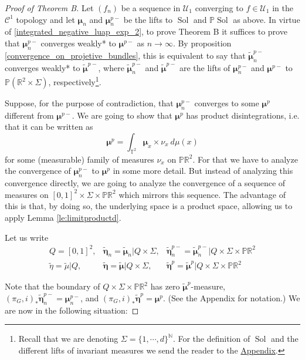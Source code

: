 \documentclass[10pt,a4paper]{amsart}
\newcommand{\N}{\mathbb{N}}
\newcommand{\Pp}{\mathbb P}
\newcommand{\RR}{\mathbb{R}^2}
\newcommand{\Sol}{\operatorname{Sol}}
\newcommand{\TT}{\mathbb{T}^2}
\newcommand{\bmu}{\boldsymbol{\mu}}
\newcommand{\tbeta}{\tilde{\boldsymbol{\eta}}}
\newcommand{\tbmu}{\tilde{\bmu}}
\newcommand{\teta}{\tilde{\eta}}
\newcommand{\tmu}{\tilde{\mu}}
\begin{document}
\begin{proof}[Proof of Theorem B]

Let $(f_n)$ be a sequence in $\mathcal U_1$ converging to $f\in\mathcal U_1$ in the $\mathcal C^1$ topology and let $\bmu_n$ and $\bmu_n^{p-}$ be the lifts to $\Sol$ and $\Pp \Sol$ as above. In virtue of \eqref{integrated_negative_luap_exp_2}, to prove Theorem B it suffices to prove that $\bmu_n^{p-}$ converges weakly* to $\bmu^{p-}$ as $n \to \infty$.
By proposition \ref{convergence_on_projetive_bundles}, this is equivalent to say that $\tbmu_n^{p-}$ converges weakly* to $\tbmu^{p-}$, where $\tbmu_n^{p-}$ and $\tbmu^{p-}$ are the lifts of $\bmu_n^{p-}$ and $\bmu^{p-}$ to $\Pp (\RR \times \Sigma)$, respectively\footnote{Recall that we are denoting $\Sigma=\{1,\cdots, d\}^{\N}$. For the definition of $\Sol$ and the different lifts of invariant measures we send the reader to the \hyperlink{sec:appendix}{Appendix}.}. 

Suppose, for the purpose of contradiction, that $\bmu_n^{p-}$ converges to some $\bmu^p$ different from $\bmu^{p-}$. We are going to show that $\bmu^p$ has product disintegrations, i.e. that it can be written as
\begin{equation} \label{structure_of_bmup} 
\bmu^p = \int_{\TT} \bmu_x \times \nu_x \ d\mu(x) 
\end{equation}
for some (measurable) family of measures $\nu_x$ on $\Pp \RR$. For that we have to analyze the convergence of $\bmu_n^{p-}$ to $\bmu^p$ in some more detail. But instead of analyzing this convergence directly, we are going to analyze the convergence of a sequence of measures on $[0,1]^2 \times \Sigma \times \Pp \RR$ which mirrors this sequence. The advantage of this is that, by doing so, the underlying space is a product space, allowing us to apply Lemma \ref{le:limitproductd}.


Let us write
\[
\begin{array}{lll}
Q = [0,1]^2, & \tbeta_n = \tbmu_n \vert Q \times \Sigma,  & \tbeta_n^{p-} = \tbmu_n^{p-} \vert Q \times \Sigma \times \Pp \RR \\
\teta = \tmu \vert Q, & \tbeta = \tbmu \vert Q \times \Sigma,  & \tbeta^{p} = \tbmu^{p} \vert Q \times \Sigma \times \Pp \RR
\end{array}
\]

Note that the boundary of $Q \times \Sigma \times \Pp \RR$ has zero $\tbmu^{p}$-measure, $(\pi_G,i)_* \tbeta_n^{p-} = \bmu_n^{p-}$, and $(\pi_G,i)_* \tbeta^p = \bmu^p$. (See the Appendix for notation.) We are now in the following situation:


\end{proof}
\end{document}
